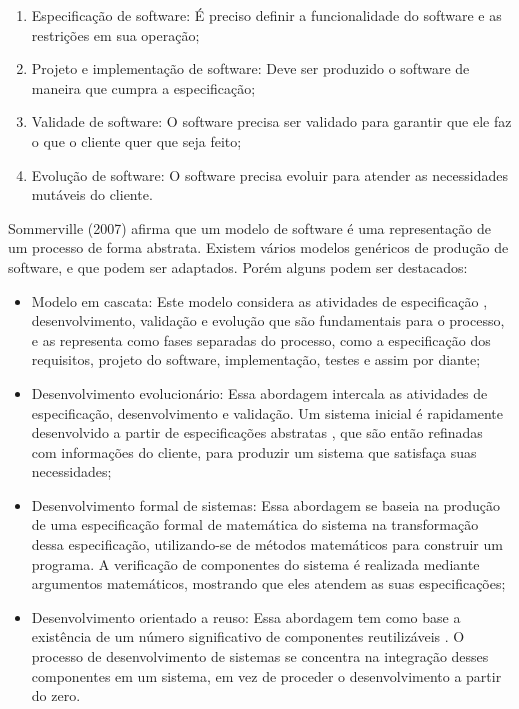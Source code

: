 \begin{enumerate}
    \item Especificação de software: É preciso definir a funcionalidade do software e as restrições em sua operação;

    \item Projeto e implementação de software: Deve ser produzido o software de maneira que cumpra a especificação;

    \item Validade de software: O software precisa ser validado para garantir que ele faz o que o cliente quer que seja feito;

    \item Evolução de software: O software precisa evoluir para atender as necessidades mutáveis do cliente.
\end{enumerate}


Sommerville (2007) afirma que um modelo de software é uma representação de um processo de forma abstrata. Existem vários modelos genéricos de produção de software, e que podem ser adaptados. Porém alguns podem ser destacados:

\begin{itemize}
    \item Modelo em cascata: Este modelo considera as atividades de especificação
        , desenvolvimento, validação e evolução que são fundamentais para 
        o processo, e as representa como fases separadas do processo, como 
        a especificação dos requisitos, projeto do software, implementação, testes e assim por diante;

    \item Desenvolvimento evolucionário: Essa abordagem intercala as atividades 
        de especificação, desenvolvimento e validação. Um sistema inicial 
        é rapidamente desenvolvido a partir de especificações abstratas
        , que são então refinadas com informações do cliente, para produzir 
        um sistema que satisfaça suas necessidades;


    \item Desenvolvimento formal de sistemas: Essa abordagem se baseia 
        na produção de uma especificação formal de matemática do sistema 
        na transformação dessa especificação, utilizando-se de métodos 
        matemáticos para construir um programa. A verificação de componentes 
        do sistema é realizada mediante argumentos matemáticos, mostrando 
        que eles atendem as suas especificações;

    \item Desenvolvimento orientado a reuso: Essa abordagem tem como base 
        a existência de um número significativo de componentes reutilizáveis
        . O processo de desenvolvimento de sistemas se concentra na integração 
        desses componentes em um sistema, em vez de proceder o desenvolvimento 
        a partir do zero.

\end{itemize}

